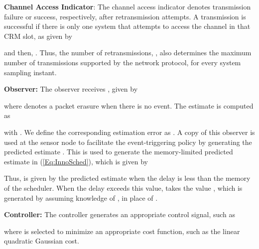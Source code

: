 \documentclass[journal]{IEEEtran}
\begin{document}
\noindent \textbf{Channel Access Indicator}: The channel access indicator  denotes transmission failure or success, respectively, after  retransmission attempts. A transmission is successful if there is only one system that attempts to access the channel in that CRM slot, as  given by

and then, . Thus, the number of retransmissions, , also determines the maximum number of transmissions supported by the network protocol, for every system sampling instant.

\noindent \textbf{Observer:} The observer  receives , given by

where  denotes a packet erasure when there is no event. The estimate is computed as

with . We define the corresponding estimation error as . A copy of this observer is used at the sensor node to facilitate the event-triggering policy by generating the predicted estimate . This is used to generate the memory-limited predicted estimate  in (\ref{Eq:InnoSched}), which is given by

Thus,  is given by the predicted estimate  when the delay is less than the memory  of the scheduler. When the delay exceeds this value,  takes the value , which is generated by assuming knowledge of , in place of .

\noindent \textbf{Controller:} The controller  generates an appropriate control signal, such as

where  is selected to minimize an appropriate cost function, such as the linear quadratic Gaussian cost.
\end{document}
